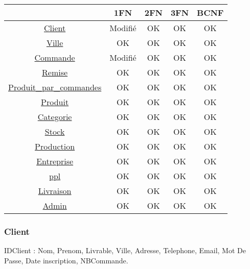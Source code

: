 \documentclass[a4paper, 12pt]{report}
\begin{document}
\begin{spacing}{1.2}
\begin{table}[H]
    \label{multiprogram}
    \begin{tabular}{c|c|c|c|c|}
        \cline{2-5}
         & 1FN & 2FN & 3FN & BCNF \\
        \hline
        \multicolumn{1}{|c|}{\hyperlink{Client}{Client}} & Modifié & OK & OK & OK \\
        \hline
        \multicolumn{1}{|c|}{\hyperlink{Ville}{Ville}} & OK & OK & OK & OK \\
        \hline
        \multicolumn{1}{|c|}{\hyperlink{Commande}{Commande}} & Modifié & OK & OK & OK \\
        \hline
        \multicolumn{1}{|c|}{\hyperlink{Remise}{Remise}} & OK & OK & OK & OK \\
        \hline
        \multicolumn{1}{|c|}{\hyperlink{ppc}{Produit\_par\_commandes}} & OK & OK & OK & OK \\
        \hline
        \multicolumn{1}{|c|}{\hyperlink{Produit}{Produit}} & OK & OK & OK & OK \\
        \hline
        \multicolumn{1}{|c|}{\hyperlink{Categorie}{Categorie}} & OK & OK & OK & OK \\
        \hline
        \multicolumn{1}{|c|}{\hyperlink{Stock}{Stock}} & OK & OK & OK & OK \\
        \hline
        \multicolumn{1}{|c|}{\hyperlink{Production}{Production}} & OK & OK & OK & OK \\
        \hline
        \multicolumn{1}{|c|}{\hyperlink{Entreprise}{Entreprise}} & OK & OK & OK & OK \\
        \hline
        \multicolumn{1}{|c|}{\hyperlink{Produit\_par\_livraison}{ppl}} & OK & OK & OK & OK \\
        \hline
        \multicolumn{1}{|c|}{\hyperlink{Livraison}{Livraison}} & OK & OK & OK & OK \\
        \hline
        \multicolumn{1}{|c|}{\hyperlink{Admin}{Admin}} & OK & OK & OK & OK \\
        \hline
    \end{tabular}
\end{table}
    
\textcolor{colortitre3}{\subsubsection*{\hypertarget{Client}{Client}}}
    
IDClient : Nom, Prenom, Livrable, Ville, Adresse, Telephone, Email, Mot De Passe, Date inscription, NBCommande.\\


\end{spacing}
\end{document}
